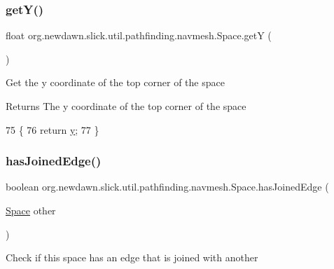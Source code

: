 \subsubsection{\texorpdfstring{get\+Y()}{getY()}}
{\footnotesize\ttfamily float org.\+newdawn.\+slick.\+util.\+pathfinding.\+navmesh.\+Space.\+getY (\begin{DoxyParamCaption}{ }\end{DoxyParamCaption})\hspace{0.3cm}{\ttfamily [inline]}}

Get the y coordinate of the top corner of the space

\begin{DoxyReturn}{Returns}
The y coordinate of the top corner of the space 
\end{DoxyReturn}

\begin{DoxyCode}
75                         \{
76         \textcolor{keywordflow}{return} \mbox{\hyperlink{classorg_1_1newdawn_1_1slick_1_1util_1_1pathfinding_1_1navmesh_1_1_space_ad394b749482835dc1430efff0321010e}{y}};
77     \}
\end{DoxyCode}
\mbox{\label{classorg_1_1newdawn_1_1slick_1_1util_1_1pathfinding_1_1navmesh_1_1_space_ab2fb291846dcd071280d6fe3c3bad19a}} 
\subsubsection{\texorpdfstring{has\+Joined\+Edge()}{hasJoinedEdge()}}
{\footnotesize\ttfamily boolean org.\+newdawn.\+slick.\+util.\+pathfinding.\+navmesh.\+Space.\+has\+Joined\+Edge (\begin{DoxyParamCaption}\item[{\mbox{\hyperlink{classorg_1_1newdawn_1_1slick_1_1util_1_1pathfinding_1_1navmesh_1_1_space}{Space}}}]{other }\end{DoxyParamCaption})\hspace{0.3cm}{\ttfamily [inline]}}

Check if this space has an edge that is joined with another


